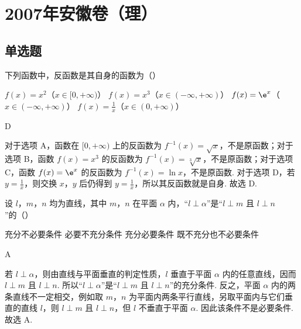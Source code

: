 \chapter{2007年安徽卷（理）}

\section{单选题}

\begin{problem}
下列函数中，反函数是其自身的函数为（\quad）

\choices
    {\(f(x) = x^{2}\)（\(x \in [0, +\infty)\)）}
    {\(f(x) = x^{3}\)（\(x \in (-\infty, +\infty)\)）}
    {\(f(x) = \e^{x}\)（\(x \in (-\infty, +\infty)\)）}
    {\(f(x) = \frac{1}{x}\)（\(x \in (0, +\infty)\)）}
\end{problem}

\begin{answer}
D
\end{answer}

\begin{solution}
对于选项 A，函数在 \([0,+\infty)\) 上的反函数为 \(f^{-1}(x)=\sqrt{x}\)，不是原函数；对于选项 B，函数 \(f(x)=x^3\) 的反函数为 \(f^{-1}(x)=\sqrt[3]{x}\)，不是原函数；对于选项 C，函数 \(f(x)=\e^x\) 的反函数为 \(f^{-1}(x)=\ln x\)，不是原函数. 对于选项 D，若 \(y=\frac{1}{x}\)，则交换 \(x\)，\(y\) 后仍得到 \(y=\frac{1}{x}\)，所以其反函数就是自身. 故选 D.
\end{solution}

\begin{problem}
设 \(l\)，\(m\)，\(n\) 均为直线，其中 \(m\)，\(n\) 在平面 \(\alpha\) 内，“\(l \perp \alpha\)”是“\(l \perp m\) 且 \(l \perp n\)”的（\quad）

\choices
    {充分不必要条件}
    {必要不充分条件}
    {充分必要条件}
    {既不充分也不必要条件}
\end{problem}

\begin{answer}
A
\end{answer}

\begin{solution}
若 \(l\perp\alpha\)，则由直线与平面垂直的判定性质，\(l\) 垂直于平面 \(\alpha\) 内的任意直线，因而 \(l\perp m\) 且 \(l\perp n\). 所以“\(l\perp\alpha\)”是“\(l\perp m\) 且 \(l\perp n\)”的充分条件. 反之，平面 \(\alpha\) 内的两条直线不一定相交，例如取 \(m\)，\(n\) 为平面内两条平行直线，另取平面内与它们垂直的直线 \(l\)，则 \(l\perp m\) 且 \(l\perp n\)，但 \(l\) 不垂直于平面 \(\alpha\). 因此该条件不是必要条件. 故选 A.
\end{solution}

